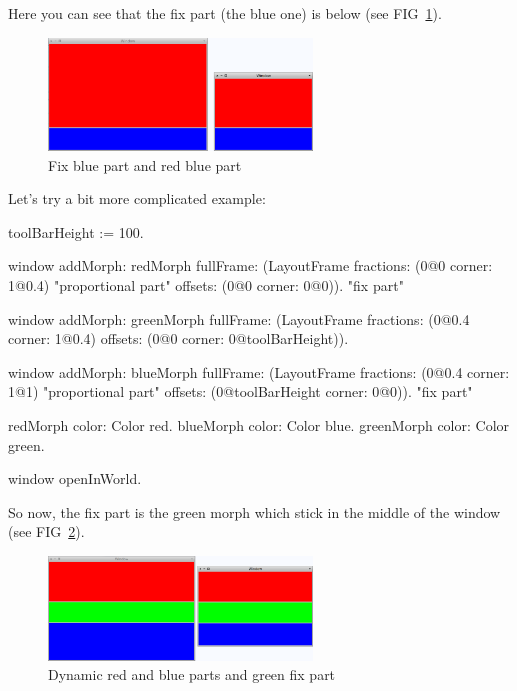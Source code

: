 \documentclass[a4paper,10pt,twoside]{book}
\begin{document}
Here you can see that the fix part (the blue one) is below (see FIG~\ref{fig:layoutFrame2}).

\begin{figure}[ht]\centering
	\includegraphics[width=7cm]{LayoutFrame2}
	\caption{Fix blue part and red blue part}
	\label{fig:layoutFrame2}
\end{figure}

Let's try a bit more complicated example:
\begin{code}{}
toolBarHeight := 100.

window
	addMorph: redMorph
	fullFrame: (LayoutFrame
				fractions: (0@0 corner: 1@0.4) "proportional part"
				offsets: (0@0 corner: 0@0)). "fix part"
				
window
	addMorph: greenMorph
	fullFrame: (LayoutFrame
				fractions: (0@0.4 corner: 1@0.4)
				offsets: (0@0 corner: 0@toolBarHeight)).				

window
	addMorph: blueMorph
	fullFrame: (LayoutFrame
				fractions: (0@0.4 corner: 1@1) "proportional part"
				offsets: (0@toolBarHeight corner: 0@0)). "fix part"

redMorph color: Color red.
blueMorph color: Color blue.
greenMorph color: Color green.
	
window openInWorld.
\end{code}

So now, the fix part is the green morph which stick in the middle of the window (see FIG~\ref{fig:layoutFrame3}).

\begin{figure}[ht]\centering
	\includegraphics[width=7cm]{LayoutFrame3}
	\caption{Dynamic red and blue parts and green fix part}
	\label{fig:layoutFrame3}
\end{figure}
\end{document}
